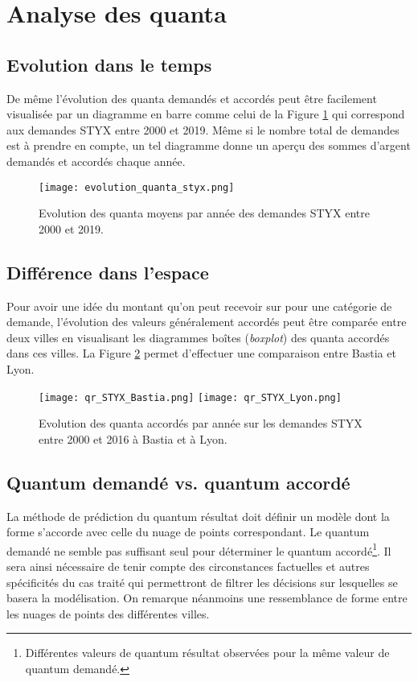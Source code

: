 \section{Analyse des quanta}
\subsection{Evolution dans le temps}
De même l'évolution des quanta demandés et accordés peut être facilement visualisée par un diagramme en barre comme celui de la Figure \ref{fig:demo:evolution-quanta-styx} qui correspond aux demandes STYX entre 2000  et 2019. Même si le nombre total de demandes est à prendre en compte, un tel diagramme donne un aperçu des sommes d'argent demandés et accordés chaque année. 

\begin{figure}[!htb]
	\centering 
	\texttt{[image: evolution\_quanta\_styx.png]}
	\caption{Evolution des quanta moyens par année des demandes STYX entre  2000  et 2019.}\label{fig:demo:evolution-quanta-styx}
\end{figure}


\subsection{Différence dans l'espace}

Pour avoir une idée du montant qu'on peut recevoir sur pour une catégorie de demande, l'évolution des valeurs généralement accordés peut être comparée entre deux villes en visualisant les diagrammes boîtes (\textit{boxplot}) 
des quanta accordés dans ces villes. La Figure \ref{fig:demo:evolution-qr-styx-compare-ville} permet d'effectuer une comparaison entre Bastia et Lyon. 

\begin{figure}[!htb]
	\centering 
	\texttt{[image: qr\_STYX\_Bastia.png]}
	\texttt{[image: qr\_STYX\_Lyon.png]}
	\caption{Evolution des quanta accordés par année sur les demandes STYX entre 2000 et 2016 à Bastia et à Lyon.}\label{fig:demo:evolution-qr-styx-compare-ville}
\end{figure}


\subsection{Quantum demandé vs. quantum accordé}
La méthode de prédiction du quantum résultat doit définir un modèle dont la forme s'accorde avec celle du nuage de points correspondant. Le quantum demandé ne semble pas suffisant seul pour déterminer le quantum accordé\footnote{Différentes valeurs de quantum résultat observées pour la même valeur de quantum demandé.}. Il sera ainsi nécessaire de tenir compte des circonstances factuelles et autres spécificités du cas traité qui permettront de filtrer les décisions sur lesquelles se basera la modélisation. On remarque néanmoins une ressemblance de forme entre les nuages de points des différentes villes. 

